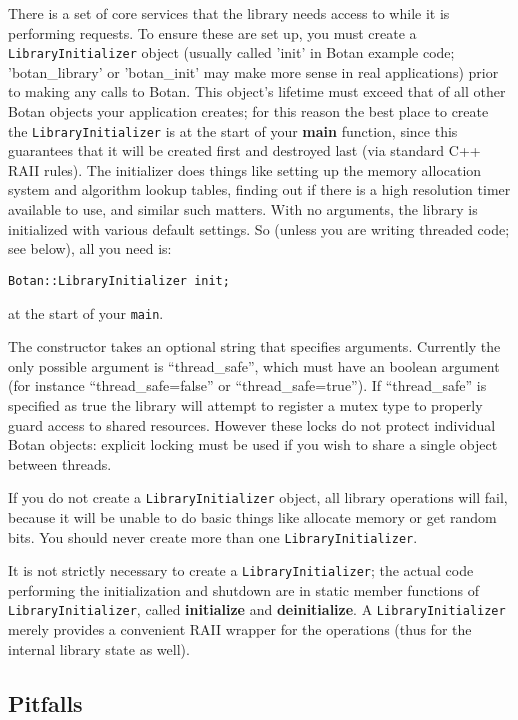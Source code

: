 \documentclass{article}
\newcommand{\function}[1]{\textbf{#1}}
\newcommand{\type}[1]{\texttt{#1}}
\begin{document}
There is a set of core services that the library needs access to while
it is performing requests. To ensure these are set up, you must create
a \type{LibraryInitializer} object (usually called 'init' in Botan
example code; 'botan\_library' or 'botan\_init' may make more sense in
real applications) prior to making any calls to Botan. This object's
lifetime must exceed that of all other Botan objects your application
creates; for this reason the best place to create the
\type{LibraryInitializer} is at the start of your \function{main}
function, since this guarantees that it will be created first and
destroyed last (via standard C++ RAII rules). The initializer does
things like setting up the memory allocation system and algorithm
lookup tables, finding out if there is a high resolution timer
available to use, and similar such matters. With no arguments, the
library is initialized with various default settings. So (unless you
are writing threaded code; see below), all you need is:

\texttt{Botan::LibraryInitializer init;}

at the start of your \texttt{main}.

The constructor takes an optional string that specifies arguments.
Currently the only possible argument is ``thread\_safe'', which must
have an boolean argument (for instance ``thread\_safe=false'' or
``thread\_safe=true''). If ``thread\_safe'' is specified as true the
library will attempt to register a mutex type to properly guard access
to shared resources. However these locks do not protect individual
Botan objects: explicit locking must be used if you wish to share a
single object between threads.

If you do not create a \type{LibraryInitializer} object, all library
operations will fail, because it will be unable to do basic things
like allocate memory or get random bits. You should never create more
than one \type{LibraryInitializer}.

It is not strictly necessary to create a \type{LibraryInitializer};
the actual code performing the initialization and shutdown are in
static member functions of \type{LibraryInitializer}, called
\function{initialize} and \function{deinitialize}. A
\type{LibraryInitializer} merely provides a convenient RAII wrapper
for the operations (thus for the internal library state as well).

\subsection{Pitfalls}
\end{document}
